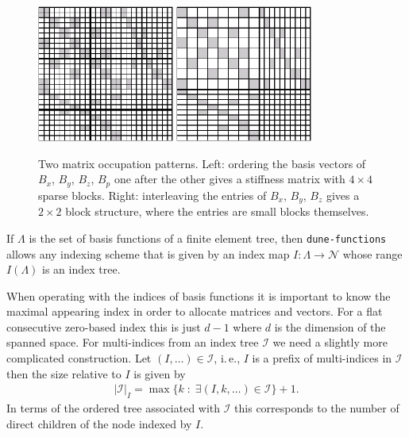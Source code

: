 \documentclass[a4paper,10pt,headings=normal,bibliography=totoc]{scrartcl}
\newcommand{\op}[1]{\operatorname{#1}}
\newcommand{\st}{\; : \;}
\newcommand{\dunemodule}[1]{\texttt{#1}}
\begin{document}
\begin{figure}
 \begin{center}
   \includegraphics[width=0.4\textwidth]{taylor-hood-matrix-lexicographic}
   \qquad
   \includegraphics[width=0.4\textwidth]{taylor-hood-matrix-interleaved}
 \end{center}
 \caption{Two matrix occupation patterns.  Left: ordering the basis vectors of $B_x$, $B_y$, $B_z$, $B_p$
   one after the other gives a stiffness matrix with $4 \times 4$ sparse blocks.
   Right: interleaving the entries of $B_x$, $B_y$, $B_z$ gives a $2 \times 2$ block structure, where
   the entries are small blocks themselves.
   }
 \label{fig:matrix_occupation_patterns}
\end{figure}



If $\Lambda$ is the set of basis functions of a finite element tree,
then \dunemodule{dune-functions} allows any indexing scheme that
is given by an index map $I: \Lambda \to \mathcal{N}$
whose range $I(\Lambda)$ is an index tree.

When operating with the indices of basis functions it is important
to know the maximal appearing index in order to allocate matrices
and vectors.
For a flat consecutive zero-based index this is just $d-1$ where
$d$ is the dimension of the spanned space. For multi-indices from
an index tree $\mathcal{I}$ we need a slightly more complicated
construction. Let $(I,\dots) \in \mathcal{I}$, i.\,e., $I$ is a
prefix of multi-indices in $\mathcal{I}$ then the size relative
to $I$ is given by
\begin{align}\label{eq:prefix_size}
    |\mathcal{I}|_I = \op{max}\{k \st \exists (I,k,\dots) \in \mathcal{I} \}+1.
\end{align}
In terms of the ordered tree associated with $\mathcal{I}$ this corresponds
to the number of direct children of the node indexed by $I$.
\end{document}
